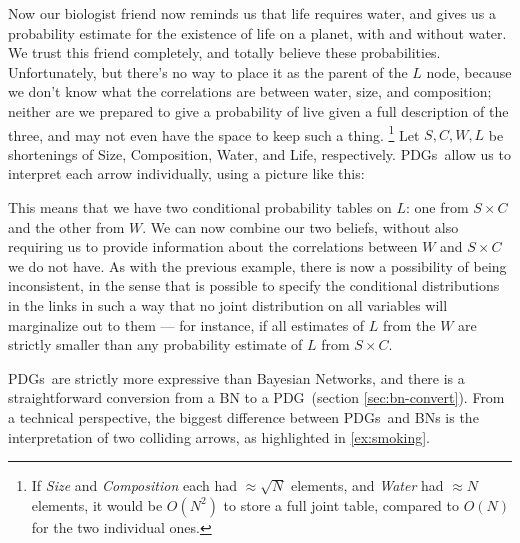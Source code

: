 \documentclass{article}
\newcommand\changed[1]{{\color{note-fg} #1}}
\newcommand{\MN}{PDG}%
\newcommand{\MNs}{PDGs}
\begin{document}
\begin{example}
		Now our biologist friend now reminds us that life requires water, and gives us a probability estimate for the existence of life on a planet, with and without water. We trust this friend completely, and totally believe these probabilities. Unfortunately, but there's no way to place it as the parent of the $L$ node, because we don't know what the correlations are between water, size, and composition; neither are we prepared to give a probability of live given a full description of the three, and may not even have the space to keep such a thing.%
			\footnote{If \textit{Size} and \textit{Composition} each had $\approx\sqrt{N}$ elements, and \textit{Water} had $\approx N$ elements, it would be $O(N^2)$ to store a full joint table, compared to $O(N)$ for the two individual ones.} %
		Let $S, C, W, L$ be shortenings of Size, Composition, Water, and Life, respectively.
		\MNs\ allow us to interpret each arrow individually, using a picture like this:

		\begin{center}
		\end{center}
	
		\changed{This means that we have} two conditional probability tables on $L$: one from $S \times C$ and the other from $W$. We can now combine our two beliefs, without also \changed{requiring us to provide information about the correlations between $W$ and $S\times C$ we do not have}. As with the previous example, there is now a possibility of being inconsistent, in the sense that is possible to specify the conditional distributions in the links in such a way that no joint distribution on all variables will marginalize out to them --- for instance, if all estimates of $L$ from the $W$ are strictly smaller than any probability estimate of $L$ from $S \times C$.
	\end{example}
	
	\MNs\ are strictly more expressive than Bayesian Networks, and there is a straightforward conversion from a BN to a \MN\ (section \ref{sec:bn-convert}). 
	From a technical perspective, the biggest difference between \MNs\ and BNs is the interpretation of two colliding arrows, as highlighted in \cref{ex:smoking}.
	
\end{document}
